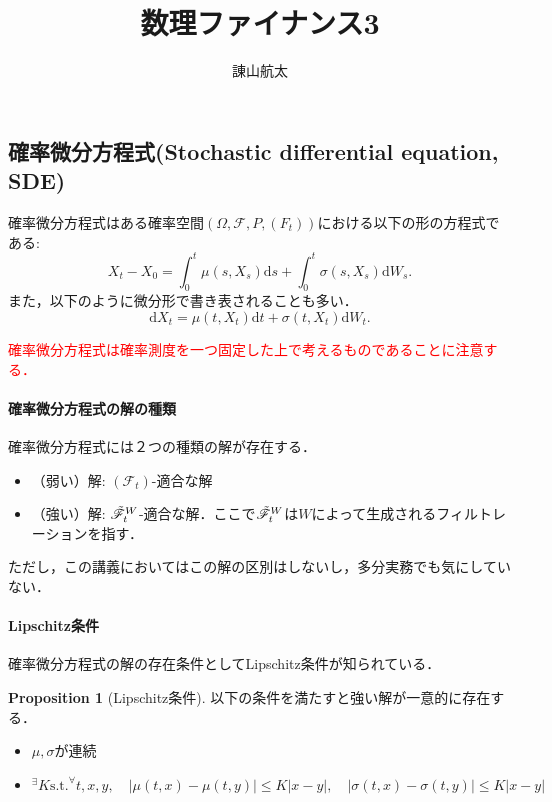 \documentclass{jsarticle}
\title{数理ファイナンス3}
\author{諌山航太}
\theoremstyle{definition}
\newtheorem{prop}[dfn]{Proposition}
\begin{document}
\maketitle

\subsection{確率微分方程式(Stochastic differential equation, SDE)}
確率微分方程式はある確率空間$(\Omega, \mathscr{F}, P, (F_t))$における以下の形の方程式である:
\begin{equation*}
    X_t - X_0 = \int_0^t \mu(s, X_s)\mathrm{d}s + \int_0^t \sigma(s, X_s) \mathrm{d}W_s.
\end{equation*}
また，以下のように微分形で書き表されることも多い．
\begin{equation*}
    \mathrm{d}X_t = \mu(t, X_t)\mathrm{d}t + \sigma(t, X_t) \mathrm{d}W_t.
\end{equation*}

\textcolor{red}{確率微分方程式は確率測度を一つ固定した上で考えるものであることに注意する．}

\paragraph{確率微分方程式の解の種類}
確率微分方程式には２つの種類の解が存在する．
\begin{itemize}
    \item （弱い）解: $(\mathscr{F}_t)$-適合な解
    \item （強い）解: $\Tilde{\mathscr{F}}_t^W$-適合な解．ここで$\Tilde{\mathscr{F}}_t^W$は$W$によって生成されるフィルトレーションを指す．
\end{itemize}
ただし，この講義においてはこの解の区別はしないし，多分実務でも気にしていない．

\paragraph{Lipschitz条件}確率微分方程式の解の存在条件としてLipschitz条件が知られている．
\begin{prop}[Lipschitz条件]
    以下の条件を満たすと強い解が一意的に存在する．
    \begin{itemize}
        \item $\mu, \sigma$が連続
        \item $^\exists K \text{s.t.} ^\forall t, x, y,\quad |\mu(t, x) - \mu(t, y)| \leq K|x-y|,\quad |\sigma(t, x) - \sigma(t, y)| \leq K|x-y|$
    \end{itemize}
\end{prop}
\end{document}
